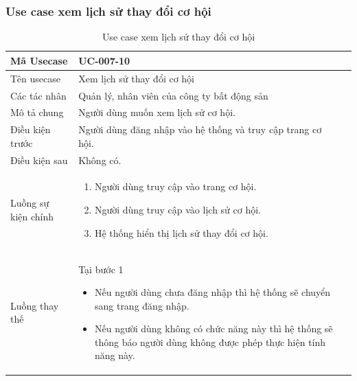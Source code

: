\documentclass[12pt,a4paper]{article}
\begin{document}
    \subsubsection*{Use case xem lịch sử thay đổi cơ hội}
    \begin{table}[H]
        \centering
        \begin{tabular}{|p{3.5cm}|p{11.5cm}|c|}
            \hline
            Mã Usecase      & UC-007-10                                                   \\
            \hline
            Tên usecase     & Xem lịch sử thay đổi cơ hội                                 \\
            \hline
            Các tác nhân    & Quản lý, nhân viên của công ty bất động sản                 \\
            \hline
            Mô tả chung     & Người dùng muốn xem lịch sử cơ hội.                         \\
            \hline

            Điều kiện trước & Người dùng đăng nhập vào hệ thống và truy cập trang cơ hội. \\
            \hline

            Điều kiện sau   & Không có.                                                   \\
            \hline

            Luồng sự kiện chính & \vspace{-.8cm}\begin{enumerate}
                                                    \item Người dùng truy cập vào trang cơ hội.
                                                    \item Người dùng truy cập vào lịch sử cơ hội.
                                                    \item Hệ thống hiển thị lịch sử thay đổi cơ hội.
            \end{enumerate}
            \\
            \hline
            Luồng thay thế & Tại bước 1\newline
            \vspace{-.8cm}\begin{itemize}
                              \item Nếu người dùng chưa đăng nhập thì hệ thống sẽ chuyển sang trang đăng nhập.
                              \item Nếu người dùng không có chức năng này thì hệ thống sẽ thông báo người dùng không được phép thực hiện tính năng này.
            \end{itemize}
            \\ \hline
        \end{tabular}
        \caption{Use case xem lịch sử thay đổi cơ hội}

    \end{table}
\end{document}
